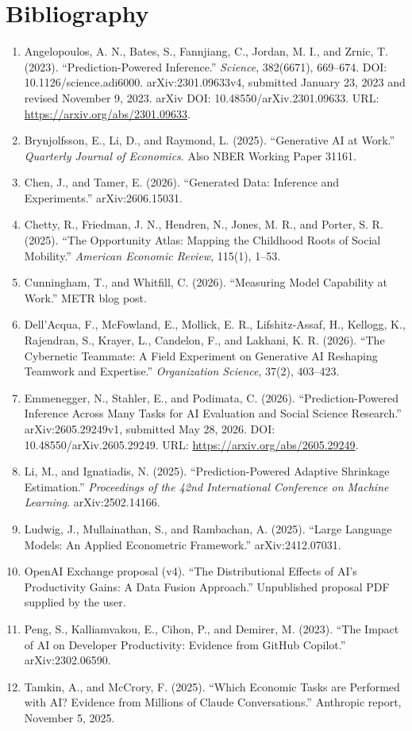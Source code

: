 \documentclass[11pt]{article}
\begin{document}
\section{Bibliography}

\begin{enumerate}[leftmargin=*]
  \item Angelopoulos, A. N., Bates, S., Fannjiang, C., Jordan, M. I., and Zrnic, T. (2023). ``Prediction-Powered Inference.'' \emph{Science}, 382(6671), 669--674. DOI: 10.1126/science.adi6000. arXiv:2301.09633v4, submitted January 23, 2023 and revised November 9, 2023. arXiv DOI: 10.48550/arXiv.2301.09633. URL: \url{https://arxiv.org/abs/2301.09633}.
  \item Brynjolfsson, E., Li, D., and Raymond, L. (2025). ``Generative AI at Work.'' \emph{Quarterly Journal of Economics}. Also NBER Working Paper 31161.
  \item Chen, J., and Tamer, E. (2026). ``Generated Data: Inference and Experiments.'' arXiv:2606.15031.
  \item Chetty, R., Friedman, J. N., Hendren, N., Jones, M. R., and Porter, S. R. (2025). ``The Opportunity Atlas: Mapping the Childhood Roots of Social Mobility.'' \emph{American Economic Review}, 115(1), 1--53.
  \item Cunningham, T., and Whitfill, C. (2026). ``Measuring Model Capability at Work.'' METR blog post.
  \item Dell'Acqua, F., McFowland, E., Mollick, E. R., Lifshitz-Assaf, H., Kellogg, K., Rajendran, S., Krayer, L., Candelon, F., and Lakhani, K. R. (2026). ``The Cybernetic Teammate: A Field Experiment on Generative AI Reshaping Teamwork and Expertise.'' \emph{Organization Science}, 37(2), 403--423.
  \item Emmenegger, N., Stahler, E., and Podimata, C. (2026). ``Prediction-Powered Inference Across Many Tasks for AI Evaluation and Social Science Research.'' arXiv:2605.29249v1, submitted May 28, 2026. DOI: 10.48550/arXiv.2605.29249. URL: \url{https://arxiv.org/abs/2605.29249}.
  \item Li, M., and Ignatiadis, N. (2025). ``Prediction-Powered Adaptive Shrinkage Estimation.'' \emph{Proceedings of the 42nd International Conference on Machine Learning}. arXiv:2502.14166.
  \item Ludwig, J., Mullainathan, S., and Rambachan, A. (2025). ``Large Language Models: An Applied Econometric Framework.'' arXiv:2412.07031.
  \item OpenAI Exchange proposal (v4). ``The Distributional Effects of AI's Productivity Gains: A Data Fusion Approach.'' Unpublished proposal PDF supplied by the user.
  \item Peng, S., Kalliamvakou, E., Cihon, P., and Demirer, M. (2023). ``The Impact of AI on Developer Productivity: Evidence from GitHub Copilot.'' arXiv:2302.06590.
  \item Tamkin, A., and McCrory, F. (2025). ``Which Economic Tasks are Performed with AI? Evidence from Millions of Claude Conversations.'' Anthropic report, November 5, 2025.
\end{enumerate}
\end{document}
